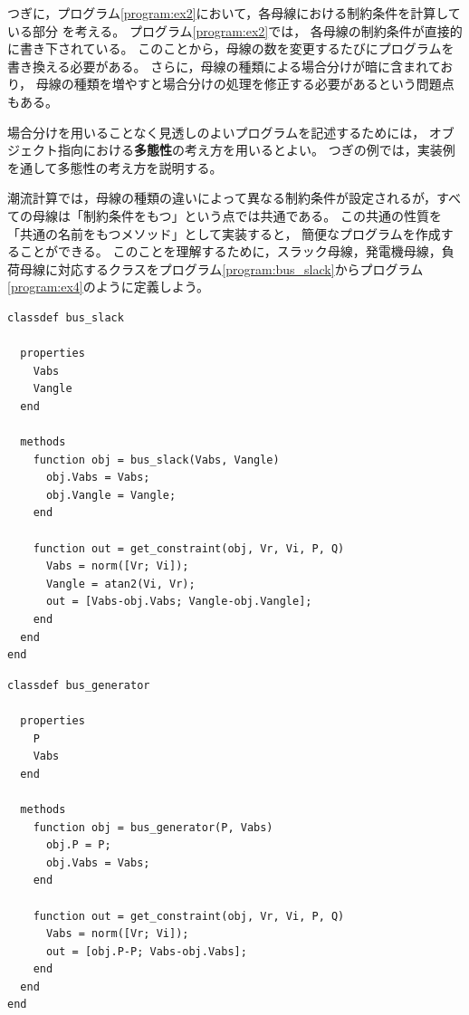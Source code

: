 \documentclass[tombow,dvipdfmx]{corona-a5-1.1}
\begin{document}
つぎに，プログラム\nobreak\ref{program:ex2}において，各母線における制約条件を計算している部分
を考える。
プログラム\nobreak\ref{program:ex2}では，
各母線の制約条件が直接的に書き下されている。
このことから，母線の数を変更するたびにプログラムを書き換える必要がある。
さらに，母線の種類による場合分けが暗に含まれており，
母線の種類を増やすと場合分けの処理を修正する必要があるという問題点もある。

場合分けを用いることなく見透しのよいプログラムを記述するためには，
オブジェクト指向における\textbf{多態性}の考え方を用いるとよい。
つぎの例では，実装例を通して多態性の考え方を説明する。

\begin{例}[多態性を用いた潮流計算の実装例]
潮流計算では，母線の種類の違いによって異なる制約条件が設定されるが，すべての母線は「制約条件をもつ」という点では共通である。
この共通の性質を「共通の名前をもつメソッド」として実装すると，
簡便なプログラムを作成することができる。
このことを理解するために，スラック母線，発電機母線，負荷母線に対応するクラスをプログラム\nobreak\ref{program:bus_slack}からプログラム\nobreak\ref{program:ex4}のように定義しよう。
\smallskip
\begin{PROGRAMA}[count,title={bus\_slack.m}]\label{program:bus_slack}
\begin{verbatim}
classdef bus_slack
  
  properties
    Vabs
    Vangle
  end
  
  methods
    function obj = bus_slack(Vabs, Vangle)
      obj.Vabs = Vabs;
      obj.Vangle = Vangle;
    end
    
    function out = get_constraint(obj, Vr, Vi, P, Q)
      Vabs = norm([Vr; Vi]);
      Vangle = atan2(Vi, Vr);
      out = [Vabs-obj.Vabs; Vangle-obj.Vangle];
    end
  end
end
\end{verbatim}
\end{PROGRAMA}

\smallskip
\begin{PROGRAMA}[count,title={bus\_genertor.m}]\label{program:bus_PV}
\begin{verbatim}
classdef bus_generator
  
  properties
    P
    Vabs
  end
  
  methods
    function obj = bus_generator(P, Vabs)
      obj.P = P;
      obj.Vabs = Vabs;
    end
    
    function out = get_constraint(obj, Vr, Vi, P, Q)
      Vabs = norm([Vr; Vi]);
      out = [obj.P-P; Vabs-obj.Vabs];
    end
  end
end
\end{verbatim}
\end{PROGRAMA}


\end{例}
\end{document}
